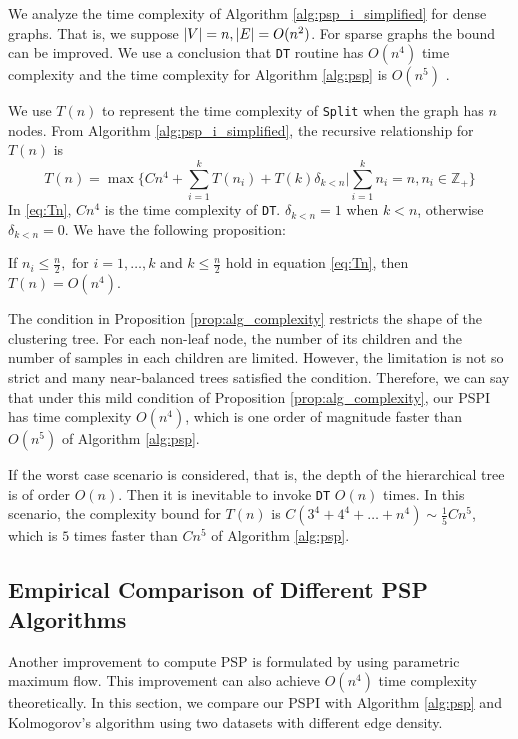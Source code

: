We analyze the time complexity of Algorithm \ref{alg:psp_i_simplified} for dense graphs. That is, we suppose $\lvert V\rvert = n, \lvert E\rvert = O(n^2)$. For sparse graphs the bound can be improved. We use a conclusion that \texttt{DT} routine has $O(n^4)$ time complexity and the time complexity for Algorithm \ref{alg:psp} is $O(n^5)$ \citep{pin}.

We use $T(n)$ to represent the time complexity of \texttt{Split} when the graph has $n$ nodes.
From Algorithm \ref{alg:psp_i_simplified}, the recursive relationship for $T(n)$ is
\begin{equation}\label{eq:Tn}
T(n) = \max \{ C n^4 + \sum_{i=1}^k T(n_i) + T(k)\delta_{k<n} | \sum_{i=1}^k n_i = n, n_i \in \mathbb{Z}_{+} \}
\end{equation}	
In \eqref{eq:Tn}, $Cn^4$ is the time complexity of \texttt{DT}. $\delta_{k<n} = 1$ when $k<n$, otherwise $\delta_{k<n}=0$. We have the following proposition:
\begin{proposition}\label{prop:alg_complexity}
	 If $n_i \leq \frac{n}{2}, \textrm{ for } i=1,\dots,k$ and $ k \leq \frac{n}{2}$  hold in equation \eqref{eq:Tn}, then $T(n) = O(n^4)$.
\end{proposition}

The condition in Proposition \ref{prop:alg_complexity} restricts the shape of the clustering tree. For each non-leaf node, the number of its children and the number of samples in each children are limited. However, the limitation is not so strict and
many near-balanced trees satisfied the condition. Therefore, we can say that under this mild condition of Proposition \ref{prop:alg_complexity},
our PSPI has time complexity $O(n^4)$, which is one order of magnitude faster than $O(n^5)$ of Algorithm \ref{alg:psp}.

If the worst case scenario is considered, that is, the depth of the hierarchical tree is of order $O(n)$. Then it is inevitable to invoke \texttt{DT} $O(n)$ times.
In this scenario, the complexity bound for $T(n)$ is $C(3^4+4^4 + \dots + n^4) \sim \frac{1}{5}Cn^5$, which is $5$ times faster than $Cn^5$ of Algorithm \ref{alg:psp}.

\subsection{Empirical Comparison of Different PSP Algorithms}
Another improvement to compute PSP is formulated by \cite{kolmogorov} using parametric maximum flow.
This improvement can also achieve $O(n^4)$ time complexity theoretically. 
In this section, we compare our PSPI with Algorithm \ref{alg:psp} and Kolmogorov's algorithm
using two datasets with different edge density.

